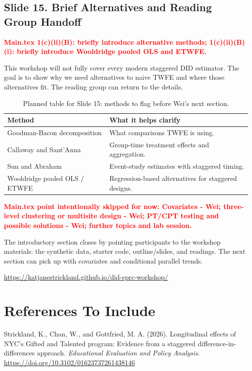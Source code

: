 \documentclass[11pt]{article}
\newcommand{\slideheading}[2]{%
  \subsection*{Slide #1. #2}
}
\newcommand{\slidecontent}[1]{#1}
\newcommand{\mainpoint}[1]{%
  \slidecontent{\textcolor{red}{\textbf{Main.tex #1}}}
}
\begin{document}
\slideheading{15}{Brief Alternatives and Reading Group Handoff}
\mainpoint{1(c)(ii)(B): briefly introduce alternative methods; 1(c)(ii)(B)(i): briefly introduce Wooldridge pooled OLS and ETWFE.}

\slidecontent{This workshop will not fully cover every modern staggered DID
estimator. The goal is to show why we need alternatives to naive TWFE and where
those alternatives fit. The reading group can return to the details.}

\begin{table}[H]
\centering
\small
\begin{tabular}{p{}p{}}
\toprule
\textbf{Method} & \textbf{What it helps clarify} \\
\midrule
Goodman-Bacon decomposition & What comparisons TWFE is using. \\
Callaway and Sant'Anna & Group-time treatment effects and aggregation. \\
Sun and Abraham & Event-study estimates with staggered timing. \\
Wooldridge pooled OLS / ETWFE & Regression-based alternatives for staggered designs. \\
\bottomrule
\end{tabular}
\caption*{\footnotesize Planned table for Slide 15: methods to flag before Wei's next section.}
\end{table}

\slidecontent{\textcolor{red}{\textbf{Main.tex point intentionally skipped for
now: Covariates - Wei; three-level clustering or multisite design - Wei; PT/CPT
testing and possible solutions - Wei; further topics and lab session.}}}

\slidecontent{The introductory section closes by pointing participants to the
workshop materials: the synthetic data, starter code, outline/slides, and
readings. The next section can pick up with covariates and conditional parallel
trends.}

\url{https://katjanestrickland.github.io/did-eprc-workshop/}

\section*{References To Include}

Strickland, K., Chan, W., and Gottfried, M. A. (2026). Longitudinal effects of
NYC's Gifted and Talented program: Evidence from a staggered
difference-in-differences approach. \emph{Educational Evaluation and Policy
Analysis}. \url{https://doi.org/10.3102/01623737261438146}
\end{document}
